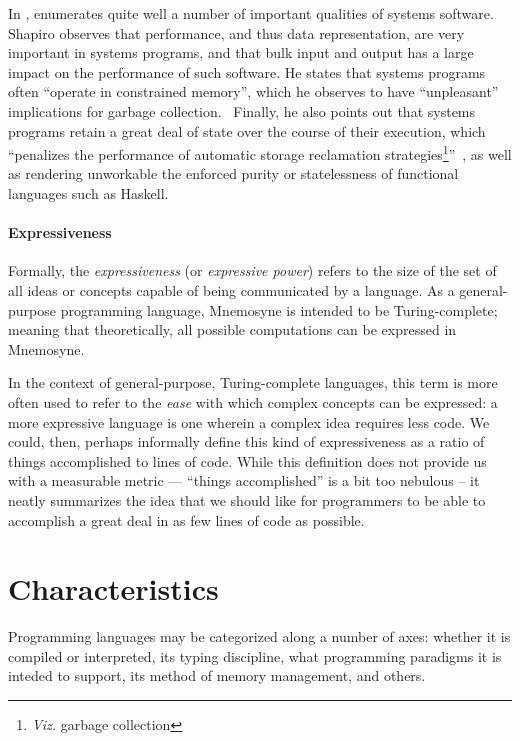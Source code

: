 In , \citeauthor{Shapiro:2006:PLC:1215995.1216004} enumerates quite well a number of important qualities of systems software. Shapiro observes that performance, and thus data representation, are very important in systems programs, and that bulk input and output has a large impact on the performance of such software. He states that systems programs often ``operate in constrained memory'', which he observes to have ``unpleasant'' implications for garbage collection.~\cite[pp. 2]{Shapiro:2006:PLC:1215995.1216004} Finally, he also points out that systems programs retain a great deal of state over the course of their execution, which ``penalizes the performance of automatic storage reclamation strategies\footnote{\emph{Viz.} garbage collection}''~\cite[pp. 2]{Shapiro:2006:PLC:1215995.1216004}, as well as rendering unworkable the enforced purity or statelessness of functional languages such as Haskell.

\paragraph{Expressiveness}

Formally, the \textit{expressiveness} (or \textit{expressive power}) refers to the size of the set of all ideas or concepts capable of being communicated by a language. As a general-purpose programming language, Mnemosyne is intended to be Turing-complete; meaning that theoretically, all possible computations can be expressed in Mnemosyne.

In the context of general-purpose, Turing-complete languages, this term is more often used to refer to the \emph{ease} with which complex concepts can be expressed: a more expressive language is one wherein a complex idea requires less code. We could, then, perhaps informally define this kind of expressiveness as a ratio of things accomplished to lines of code. While this definition does not provide us with a measurable metric --- ``things accomplished'' is a bit too nebulous -- it neatly summarizes the idea that we should like for programmers to be able to accomplish a great deal in as few lines of code as possible.

\section{Characteristics} \label{sec:characteristics}

Programming languages may be categorized along a number of axes: whether it is compiled or interpreted, its typing discipline, what programming paradigms it is inteded to support, its method of memory management, and others.

